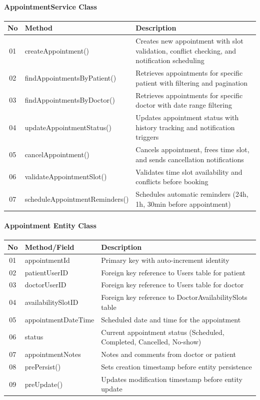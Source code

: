 \documentclass[12pt,a4paper]{article}
\begin{document}
\paragraph{AppointmentService Class}
\begin{longtable}{|c|l|p{8cm}|}
\hline
\textbf{No} & \textbf{Method} & \textbf{Description} \\
\hline
01 & createAppointment() & Creates new appointment with slot validation, conflict checking, and notification scheduling \\
\hline
02 & findAppointmentsByPatient() & Retrieves appointments for specific patient with filtering and pagination \\
\hline
03 & findAppointmentsByDoctor() & Retrieves appointments for specific doctor with date range filtering \\
\hline
04 & updateAppointmentStatus() & Updates appointment status with history tracking and notification triggers \\
\hline
05 & cancelAppointment() & Cancels appointment, frees time slot, and sends cancellation notifications \\
\hline
06 & validateAppointmentSlot() & Validates time slot availability and conflicts before booking \\
\hline
07 & scheduleAppointmentReminders() & Schedules automatic reminders (24h, 1h, 30min before appointment) \\
\hline
\end{longtable}

\paragraph{Appointment Entity Class}
\begin{longtable}{|c|l|p{8cm}|}
\hline
\textbf{No} & \textbf{Method/Field} & \textbf{Description} \\
\hline
01 & appointmentId & Primary key with auto-increment identity \\
\hline
02 & patientUserID & Foreign key reference to Users table for patient \\
\hline
03 & doctorUserID & Foreign key reference to Users table for doctor \\
\hline
04 & availabilitySlotID & Foreign key reference to DoctorAvailabilitySlots table \\
\hline
05 & appointmentDateTime & Scheduled date and time for the appointment \\
\hline
06 & status & Current appointment status (Scheduled, Completed, Cancelled, No-show) \\
\hline
07 & appointmentNotes & Notes and comments from doctor or patient \\
\hline
08 & prePersist() & Sets creation timestamp before entity persistence \\
\hline
09 & preUpdate() & Updates modification timestamp before entity update \\
\hline
\end{longtable}
\end{document}
